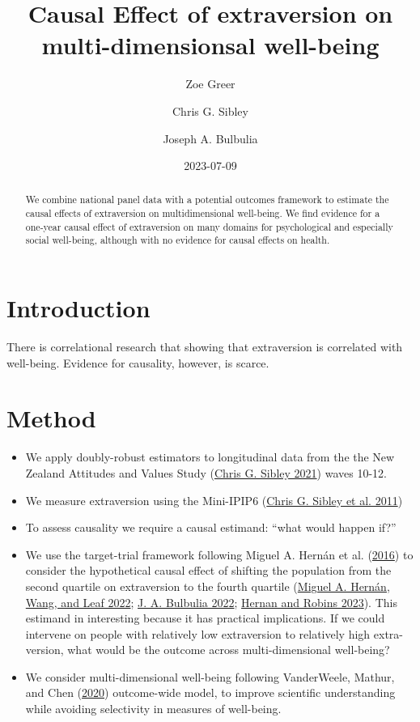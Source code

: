 \documentclass[
  singlecolumn]{report}
\title{Causal Effect of extraversion on multi-dimensionsal well-being}
\author{Zoe Greer \and Chris G. Sibley \and Joseph A. Bulbulia}
\date{2023-07-09}
\providecommand{\tightlist}{%
  \setlength{\itemsep}{0pt}\setlength{\parskip}{0pt}}\usepackage{longtable,booktabs,array}
\begin{document}
\maketitle
\begin{abstract}
We combine national panel data with a potential outcomes framework to
estimate the causal effects of extraversion on multidimensional
well-being. We find evidence for a one-year causal effect of
extraversion on many domains for psychological and especially social
well-being, although with no evidence for causal effects on health.
\end{abstract}
\ifdefined\Shaded\renewenvironment{Shaded}{\begin{tcolorbox}[borderline west={3pt}{0pt}{shadecolor}, sharp corners, boxrule=0pt, frame hidden, interior hidden, enhanced, breakable]}{\end{tcolorbox}}\fi

\listoffigures
\listoftables
\hypertarget{introduction}{%
\section{Introduction}\label{introduction}}

There is correlational research that showing that extraversion is
correlated with well-being. Evidence for causality, however, is scarce.

\hypertarget{method}{%
\section{Method}\label{method}}

\begin{itemize}
\tightlist
\item
  We apply doubly-robust estimators to longitudinal data from the the
  New Zealand Attitudes and Values Study
  (\protect\hyperlink{ref-sibley2021}{Chris G. Sibley 2021}) waves
  10-12.
\item
  We measure extraversion using the Mini-IPIP6
  (\protect\hyperlink{ref-sibley2011}{Chris G. Sibley et al. 2011})
\item
  To assess causality we require a causal estimand: ``what would happen
  if?''
\item
  We use the target-trial framework following Miguel A. Hernán et al.
  (\protect\hyperlink{ref-hernuxe1n2016}{2016}) to consider the
  hypothetical causal effect of shifting the population from the second
  quartile on extraversion to the fourth quartile
  (\protect\hyperlink{ref-hernuxe1n2022}{Miguel A. Hernán, Wang, and
  Leaf 2022}; \protect\hyperlink{ref-bulbulia2022}{J. A. Bulbulia 2022};
  \protect\hyperlink{ref-hernan2023}{Hernan and Robins 2023}). This
  estimand in interesting because it has practical implications. If we
  could intervene on people with relatively low extraversion to
  relatively high extra-version, what would be the outcome across
  multi-dimensional well-being?
\item
  We consider multi-dimensional well-being following VanderWeele,
  Mathur, and Chen (\protect\hyperlink{ref-vanderweele2020}{2020})
  outcome-wide model, to improve scientific understanding while avoiding
  selectivity in measures of well-being.
\end{itemize}
\end{document}
